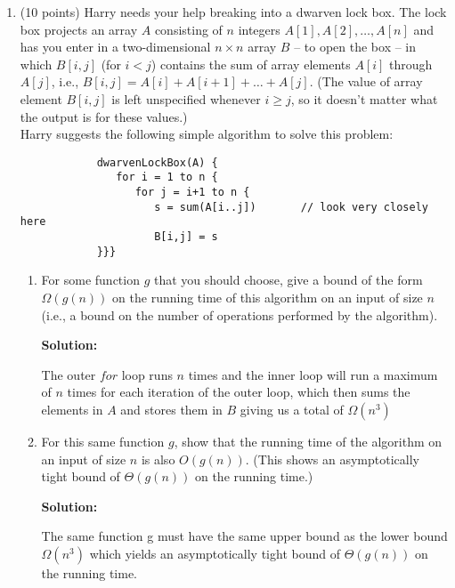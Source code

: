 \documentclass[12pt]{article}
\begin{document}
\begin{enumerate}
	\item (10 points) Harry needs your help breaking into a dwarven lock box. 
	The lock box projects an array $A$ consisting of $n$ integers $A[1], A[2], \dots , A[n]$ and has you enter in a 
	two-dimensional $n\times n$ array $B$ -- to open the box -- in which $B[i,j]$ (for $i<j$) contains the sum of 
	array elements $A[i]$ through $A[j]$, i.e., $B[i,j] = A[i]+A[i+1]+\dots+A[j]$. 
	(The value of array element $B[i,j]$ is left unspecified whenever $i\geq j$, so it doesn't matter what the output is for these values.)\\
	Harry suggests the following simple algorithm to solve this problem:\par
	\begin{small}
    	\begin{verbatim}
        	dwarvenLockBox(A) {
        	   for i = 1 to n {
        	      for j = i+1 to n {
        	         s = sum(A[i..j])       // look very closely here
        	         B[i,j] = s
        	}}}
    	\end{verbatim}
	\end{small}

	\begin{enumerate}
		\item For some function $g$ that you should choose, give a bound of the form $\Omega(g(n))$ on the running time of this 
		algorithm on an input of size $n$ (i.e., a bound on the number of operations performed by the algorithm).\par
		\textbf{Solution:}\par
		The outer $for$ loop runs $n$ times and the inner loop will run a maximum of $n$ times for each iteration of 
		the outer loop, which then sums the elements in $A$ and stores them in $B$ giving us a total of $\Omega(n^{3})$\par 
		\item For this same function $g$, show that the running time of the algorithm on an input of size $n$ is also $O(g(n))$. 
		(This shows an asymptotically tight bound of $\Theta(g(n))$ on the running time.)\par
		\textbf{Solution:}\par
		The same function g must have the same upper bound as the lower bound$\Omega(n^{3})$ which yields an asymptotically tight bound 
		of $\Theta(g(n))$ on the running time.\par
	\end{enumerate}

    \newpage


\end{enumerate}
\end{document}
